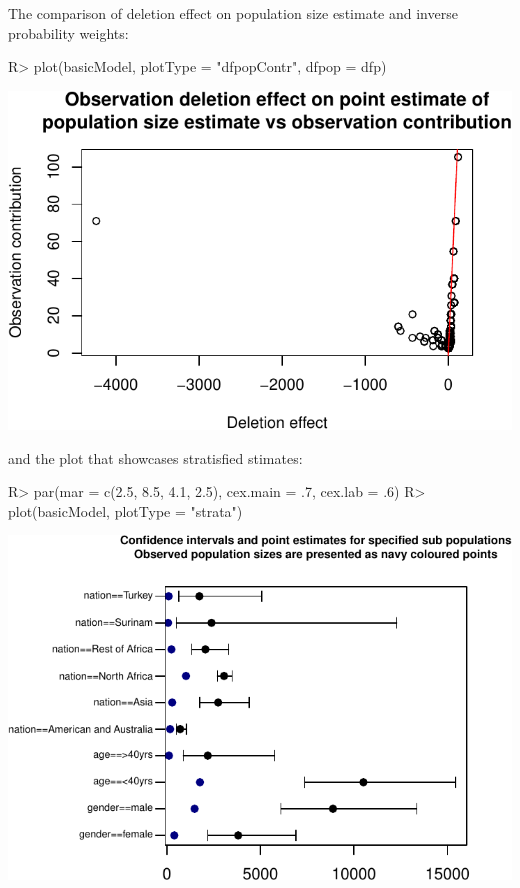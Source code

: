 \documentclass[
]{jss}
\newcommand{\1}{\mathcal{I}} \newcommand{\bZero}{\boldsymbol{0}}
\begin{document}
The comparison of deletion effect on population size estimate and
inverse probability weights:

\begin{CodeChunk}
\begin{CodeInput}
R> plot(basicModel, plotType = "dfpopContr", dfpop = dfp)
\end{CodeInput}


\begin{center}\includegraphics{singleRcapture_files/figure-latex/dfpopsize_plot-1} \end{center}

\end{CodeChunk}

and the plot that showcases stratisfied stimates:

\begin{CodeChunk}
\begin{CodeInput}
R> par(mar = c(2.5, 8.5, 4.1, 2.5), cex.main = .7, cex.lab = .6)
R> plot(basicModel, plotType = "strata")
\end{CodeInput}


\begin{center}\includegraphics{singleRcapture_files/figure-latex/strata_plot-1} \end{center}

\end{CodeChunk}
\end{document}
